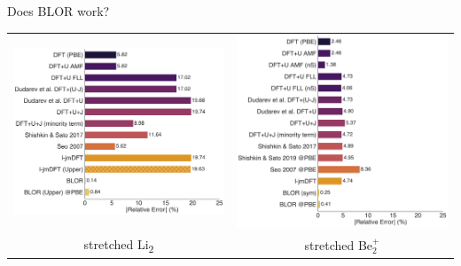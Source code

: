 \documentclass[xcolor=table,aspectratio=169]{beamer}
\numberwithin{equation}{section}
\begin{document}
\begin{frame}{Does BLOR work?}
    \begin{tabularx}{0.9\textwidth}{CC}
        \includegraphics[height=0.6\textheight]{figures/burgess/Li2.pdf} &
        \includegraphics[height=0.6\textheight]{figures/burgess/Be2+.pdf}  \\
        stretched Li\textsubscript{2}                                    &
        stretched Be$_2^+$                                                 \\
    \end{tabularx}
\end{frame}
\end{document}
